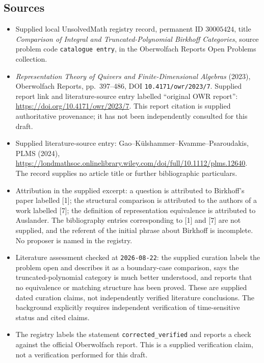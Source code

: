 \documentclass[11pt]{article}
\begin{document}
\subsection{Sources}
\begin{itemize}
\item Supplied local UnsolvedMath registry record, permanent ID \(30005424\), title \emph{Comparison of Integral and Truncated-Polynomial Birkhoff Categories}, source problem code \texttt{catalogue entry}, in the Oberwolfach Reports Open Problems collection.
\item \emph{Representation Theory of Quivers and Finite-Dimensional Algebras} (2023), Oberwolfach Reports, pp.\ 397--486, DOI \texttt{10.4171/owr/2023/7}. Supplied report link and literature-source entry labelled ``original OWR report'': \url{https://doi.org/10.4171/owr/2023/7}. This report citation is supplied authoritative provenance; it has not been independently consulted for this draft.
\item Supplied literature-source entry: Gao--K\"ulshammer--Kvamme--Psaroudakis, PLMS (2024), \url{https://londmathsoc.onlinelibrary.wiley.com/doi/full/10.1112/plms.12640}. The record supplies no article title or further bibliographic particulars.
\item Attribution in the supplied excerpt: a question is attributed to Birkhoff's paper labelled [1]; the structural comparison is attributed to the authors of a work labelled [7]; the definition of representation equivalence is attributed to Auslander. The bibliography entries corresponding to [1] and [7] are not supplied, and the referent of the initial phrase about Birkhoff is incomplete. No proposer is named in the registry.
\item Literature assessment checked at \texttt{2026-08-22}: the supplied curation labels the problem open and describes it as a boundary-case comparison, says the truncated-polynomial category is much better understood, and reports that no equivalence or matching structure has been proved. These are supplied dated curation claims, not independently verified literature conclusions. The background explicitly requires independent verification of time-sensitive status and cited claims.
\item The registry labels the statement \texttt{corrected\_verified} and reports a check against the official Oberwolfach report. This is a supplied verification claim, not a verification performed for this draft.
\end{itemize}
\end{document}
